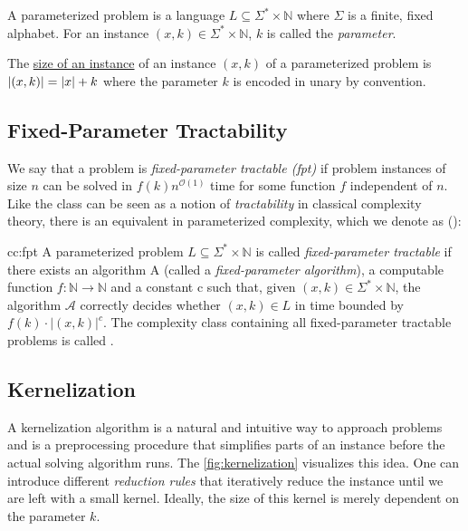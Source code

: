 \begin{definition}
    A parameterized problem is a language $L\subseteq\Sigma^*\times \mathbb{N}$ where $\Sigma$ is a finite, fixed alphabet.
    For an instance $(x,k) \in \Sigma^*\times \mathbb{N}$, $k$ is called the \textit{parameter}.

    The \underline{size of an instance} of an instance $(x,k)$ of a parameterized problem is $\abs{(x,k)} = \abs{x} + k$ where the parameter $k$ is encoded in unary by convention.
\end{definition}

\subsection{Fixed-Parameter Tractability}
We say that a problem is \textit{fixed-parameter tractable (fpt)} if problem instances of size $n$ can be solved in $f(k)n^{\mathcal{O}(1)}$ time for some function $f$ independent of $n$. 
Like the class \Pt can be seen as a notion of \textit{tractability} in classical complexity theory, there is an equivalent in parameterized complexity, which we denote as \FPTl (\FPT):

\begin{cc} {cc:fpt}
    A parameterized problem $L\subseteq\Sigma^*\times\mathbb{N}$ is called \textit{fixed-parameter tractable} if there exists an algorithm A (called a \textit{fixed-parameter algorithm}), a computable function $f:\mathbb{N} \rightarrow \mathbb{N}$ and a constant c such that, given $(x,k) \in \Sigma^* \times \mathbb{N}$, the algorithm $\mathcal{A}$ correctly decides whether $(x,k) \in L$ in time bounded by $f(k) \cdot |(x,k)|^c$. The complexity class containing all fixed-parameter tractable problems is called \FPT.
\end{cc}
\subsection{Kernelization}

A kernelization algorithm is a natural and intuitive way to approach problems and is a preprocessing procedure that simplifies parts of an instance before the actual solving algorithm runs. 
The \cref{fig:kernelization} visualizes this idea.
One can introduce different \textit{reduction rules} that iteratively reduce the instance until we are left with a small kernel. 
Ideally, the size of this kernel is merely dependent on the parameter $k$.

